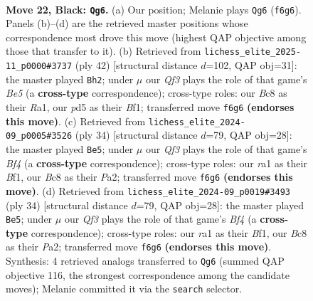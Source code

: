 \documentclass[11pt]{article}
\begin{document}
\clearpage

\begin{figure}[p]\centering
\begin{subfigure}{0.46\textwidth}\centering
\resizebox{\linewidth}{!}{%
\newchessgame
\chessboard[
  setfen={r1b3k1/pppp1pp1/1b1n1q1p/3P4/6B1/2N2P1P/PPP3P1/R1B1QK2 b - - 0 22},
  showmover=false,
  pgfstyle=straightmove, color=movearrow, markmove={f6-g6}
]}
\caption{}
\end{subfigure}\hfill
\begin{subfigure}{0.46\textwidth}\centering
\resizebox{\linewidth}{!}{%
\newchessgame
\chessboard[
  setfen={4r1k1/pp1qb1pp/2pn1p2/3pBb2/P2P4/1QP2N1P/1P3PP1/R4BK1 w - - 0 22},
  showmover=false,
  pgfstyle=straightmove, color=movearrow, markmove={e5-h2}
]}
\caption{}
\end{subfigure}
\\[4pt]
\begin{subfigure}{0.46\textwidth}\centering
\resizebox{\linewidth}{!}{%
\newchessgame
\chessboard[
  setfen={r2q2k1/pp3pp1/2pn1b1p/3p1b2/3P1B2/2P1QN1P/PP3PP1/R4BK1 w - - 0 18},
  showmover=false,
  pgfstyle=straightmove, color=movearrow, markmove={f4-e5}
]}
\caption{}
\end{subfigure}\hfill
\begin{subfigure}{0.46\textwidth}\centering
\resizebox{\linewidth}{!}{%
\newchessgame
\chessboard[
  setfen={r2q2k1/pp3pp1/2pn1b1p/3p1b2/3P1B2/2P1QN1P/PP3PP1/R4BK1 w - - 0 18},
  showmover=false,
  pgfstyle=straightmove, color=movearrow, markmove={f4-e5}
]}
\caption{}
\end{subfigure}
\caption{\textbf{Move 22, Black: \texttt{Qg6}.} (a) Our position; Melanie plays \texttt{Qg6} (\texttt{f6g6}). Panels (b)--(d) are the retrieved master positions whose correspondence most drove this move (highest QAP objective among those that transfer to it). (b) Retrieved from \texttt{lichess\_elite\_2025-11\_p0000\#3737} (ply 42) [structural distance $d$=102, QAP obj=31]: the master played \texttt{Bh2}; under $\mu$ our \emph{Qf3} plays the role of that game's \emph{Be5} (a \textbf{cross-type} correspondence); cross-type roles: our \emph{B}c8 as their \emph{R}a1, our \emph{p}d5 as their \emph{B}f1; transferred move \texttt{f6g6} \textbf{(endorses this move)}. (c) Retrieved from \texttt{lichess\_elite\_2024-09\_p0005\#3526} (ply 34) [structural distance $d$=79, QAP obj=28]: the master played \texttt{Be5}; under $\mu$ our \emph{Qf3} plays the role of that game's \emph{Bf4} (a \textbf{cross-type} correspondence); cross-type roles: our \emph{r}a1 as their \emph{B}f1, our \emph{B}c8 as their \emph{P}a2; transferred move \texttt{f6g6} \textbf{(endorses this move)}. (d) Retrieved from \texttt{lichess\_elite\_2024-09\_p0019\#3493} (ply 34) [structural distance $d$=79, QAP obj=28]: the master played \texttt{Be5}; under $\mu$ our \emph{Qf3} plays the role of that game's \emph{Bf4} (a \textbf{cross-type} correspondence); cross-type roles: our \emph{r}a1 as their \emph{B}f1, our \emph{B}c8 as their \emph{P}a2; transferred move \texttt{f6g6} \textbf{(endorses this move)}. Synthesis: 4 retrieved analogs transferred to \texttt{Qg6} (summed QAP objective 116, the strongest correspondence among the candidate moves); Melanie committed it via the \texttt{search} selector.}

\end{figure}
\end{document}
